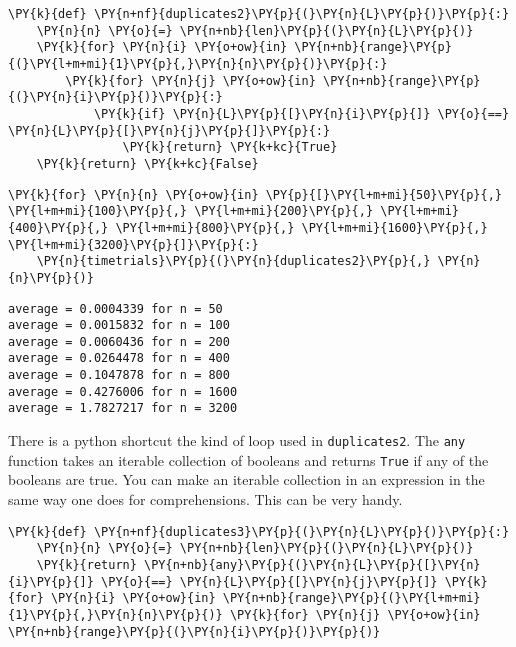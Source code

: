 \begin{Verbatim}[commandchars=\\\{\}]
\PY{k}{def} \PY{n+nf}{duplicates2}\PY{p}{(}\PY{n}{L}\PY{p}{)}\PY{p}{:}
    \PY{n}{n} \PY{o}{=} \PY{n+nb}{len}\PY{p}{(}\PY{n}{L}\PY{p}{)}
    \PY{k}{for} \PY{n}{i} \PY{o+ow}{in} \PY{n+nb}{range}\PY{p}{(}\PY{l+m+mi}{1}\PY{p}{,}\PY{n}{n}\PY{p}{)}\PY{p}{:}
        \PY{k}{for} \PY{n}{j} \PY{o+ow}{in} \PY{n+nb}{range}\PY{p}{(}\PY{n}{i}\PY{p}{)}\PY{p}{:}
            \PY{k}{if} \PY{n}{L}\PY{p}{[}\PY{n}{i}\PY{p}{]} \PY{o}{==} \PY{n}{L}\PY{p}{[}\PY{n}{j}\PY{p}{]}\PY{p}{:}
                \PY{k}{return} \PY{k+kc}{True}
    \PY{k}{return} \PY{k+kc}{False}
\end{Verbatim}



\begin{Verbatim}[commandchars=\\\{\}]
\PY{k}{for} \PY{n}{n} \PY{o+ow}{in} \PY{p}{[}\PY{l+m+mi}{50}\PY{p}{,} \PY{l+m+mi}{100}\PY{p}{,} \PY{l+m+mi}{200}\PY{p}{,} \PY{l+m+mi}{400}\PY{p}{,} \PY{l+m+mi}{800}\PY{p}{,} \PY{l+m+mi}{1600}\PY{p}{,} \PY{l+m+mi}{3200}\PY{p}{]}\PY{p}{:}
    \PY{n}{timetrials}\PY{p}{(}\PY{n}{duplicates2}\PY{p}{,} \PY{n}{n}\PY{p}{)}
\end{Verbatim}

\begin{Verbatim}
average = 0.0004339 for n = 50
average = 0.0015832 for n = 100
average = 0.0060436 for n = 200
average = 0.0264478 for n = 400
average = 0.1047878 for n = 800
average = 0.4276006 for n = 1600
average = 1.7827217 for n = 3200
\end{Verbatim}


There is a python shortcut the kind of loop used in \texttt{duplicates2}.
The \texttt{any} function takes an iterable collection of booleans and returns \texttt{True} if any of the booleans are true.
You can make an iterable collection in an expression in the same way one does for comprehensions.
This can be very handy.

\begin{Verbatim}[commandchars=\\\{\}]
\PY{k}{def} \PY{n+nf}{duplicates3}\PY{p}{(}\PY{n}{L}\PY{p}{)}\PY{p}{:}
    \PY{n}{n} \PY{o}{=} \PY{n+nb}{len}\PY{p}{(}\PY{n}{L}\PY{p}{)}
    \PY{k}{return} \PY{n+nb}{any}\PY{p}{(}\PY{n}{L}\PY{p}{[}\PY{n}{i}\PY{p}{]} \PY{o}{==} \PY{n}{L}\PY{p}{[}\PY{n}{j}\PY{p}{]} \PY{k}{for} \PY{n}{i} \PY{o+ow}{in} \PY{n+nb}{range}\PY{p}{(}\PY{l+m+mi}{1}\PY{p}{,}\PY{n}{n}\PY{p}{)} \PY{k}{for} \PY{n}{j} \PY{o+ow}{in} \PY{n+nb}{range}\PY{p}{(}\PY{n}{i}\PY{p}{)}\PY{p}{)}
\end{Verbatim}



